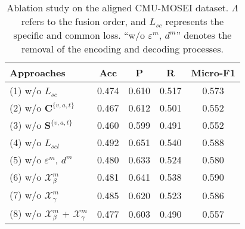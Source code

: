 \begin{table}[t]
\begin{center} 
\caption{Ablation study on the aligned CMU-MOSEI dataset. $\Lambda$ refers to the fusion order, and ${{L}_{sc}}$ represents the specific and common loss. ``w/o $\varepsilon ^m$, $d^m$'' denotes the removal of the encoding and decoding processes.}\label{tab:ablation} 
\vspace{-1em}
\resizebox{\columnwidth}{!}
{ 
\begin{tabular}{lcccc}
\hline
\hline
Approaches                                                                                   
& Acc   & P     & R     & Micro-F1 
\\ 
\hline


(1) w/o ${{L}_{sc}}$                                                                                      
& 0.474 & 0.610  & 0.517 & 0.573    
\\

(2) w/o $\bm{C}^{\{v,a,t\}}$                                                             
& 0.467 & 0.612 & 0.501 & 0.552    
\\

(3) w/o $\bm{S}^{\{v,a,t\}}$                                                            
& 0.460  & 0.599 & 0.491 & 0.552    
\\
\hline

(4) w/o ${{L}_{scl}}$                                                                               
& 0.492 & 0.651 & 0.540  & 0.588    
\\

(5) w/o $\varepsilon ^m$, $d^m$                                             
& 0.480  & 0.633 & 0.524 & 0.580     
\\

(6) w/o $\bm{\mathcal{X}}_\beta^m$                                              
& 0.481 & 0.641 & 0.538 & 0.590     
\\

(7) w/o $\bm{\mathcal{X}}_\gamma^m$                                               
& 0.485 & 0.620  & 0.523 & 0.586    
\\

(8) w/o $\bm{\mathcal{X}}_\beta^m$ + $\bm{\mathcal{X}}_\gamma^m$ 
& 0.477 & 0.603 & 0.490  & 0.557    
\\ 


\end{tabular}}
\end{center}
\end{table}
